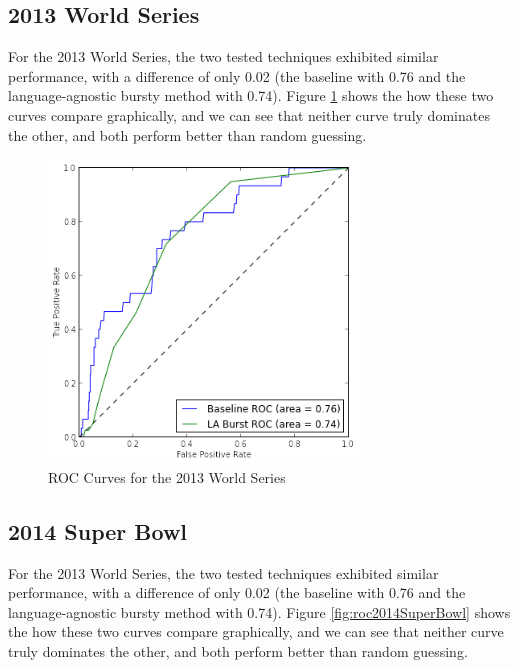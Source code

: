 \documentclass{acm_proc_article-sp}
\begin{document}
\subsection{2013 World Series}

For the 2013 World Series, the two tested techniques exhibited similar performance, with a difference of only 0.02 (the baseline with 0.76 and the language-agnostic bursty method with 0.74).
Figure \ref{fig:roc2013WorldSeries} shows the how these two curves compare graphically, and we can see that neither curve truly dominates the other, and both perform better than random guessing.

\begin{figure}[hbtp]
\begin{center}
\includegraphics[width=3.25in]{./figures/roc_2013_WorldSeries.png}
\caption{ROC Curves for the 2013 World Series}
\label{fig:roc2013WorldSeries}
\end{center}
\end{figure}

\subsection{2014 Super Bowl}

For the 2013 World Series, the two tested techniques exhibited similar performance, with a difference of only 0.02 (the baseline with 0.76 and the language-agnostic bursty method with 0.74).
Figure \ref{fig:roc2014SuperBowl} shows the how these two curves compare graphically, and we can see that neither curve truly dominates the other, and both perform better than random guessing.
\end{document}
